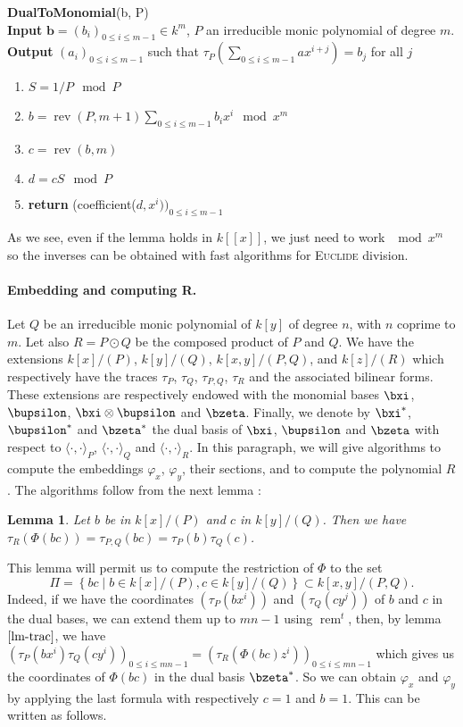 \documentclass[a4paper,11pt]{article}
\theoremstyle{break}
\newtheorem{lm}[thm]{Lemma}
\theoremstyle{definition}
\theoremstyle{remark}
\DeclareMathOperator{\rev}{rev}
\DeclareMathOperator{\rem}{rem}
\newcommand{\ps}[2]{\langle#1,#2\rangle}
\newcommand{\psdot}{\ps{\cdot}{\cdot}}
\newcommand{\remt}{\rem^t}
\begin{document}
\textbf{DualToMonomial}(b, P)\\
\textbf{Input} $\textbf{b}=(b_i)_{0\leq i\leq m-1}\in k^m$, $P$ an irreducible
monic polynomial of degree $m$.\\
\textbf{Output} $(a_i)_{0\leq i \leq m-1}$ such that
$\tau_P(\sum_{0\leq i \leq m-1}ax^{i+j})=b_j$ for all $j$
\begin{enumerate}
  \item $S=1/P \mod P$
  \item $b=\rev(P,m+1)\sum_{0\leq i\leq m-1}b_ix^i\mod x^m$
  \item $c=\rev(b,m)$
  \item $d=cS \mod P$
  \item \textbf{return} (coefficient($d,x^i))_{0\leq i \leq m-1}$
\end{enumerate}

As we see, even if the lemma holds in $k[[x]]$, we just need to work $\mod x^m$
so the inverses can be obtained with fast algorithms for \textsc{Euclide}
division.

\paragraph{Embedding and computing R.} Let $Q$ be an irreducible monic
polynomial of $k[y]$ of degree $n$, with $n$ coprime to $m$. Let also $R=P\odot
Q$ be the composed product of $P$ and $Q$. We have the extensions $k[x]/(P)$,
$k[y]/(Q)$, $k[x,y]/(P,Q)$, and $k[z]/(R)$ which respectively have the traces
$\tau_P$, $\tau_Q$, $\tau_{P,Q}$, $\tau_R$ and the associated bilinear forms.
These extensions are respectively endowed with the monomial bases $\bxi$,
$\bupsilon$, $\bxi\otimes\bupsilon$ and $\bzeta$. Finally, we denote by
$\bxi^*$, $\bupsilon^*$ and $\bzeta^*$ the dual basis of $\bxi$, $\bupsilon$ and
$\bzeta$ with respect to $\psdot_P$, $\psdot_Q$ and $\psdot_R$. In this paragraph, we will
give algorithms to compute the embeddings $\varphi_x$, $\varphi_y$, their
sections, and to compute the polynomial $R$. The algorithms follow from the next
lemma :
\begin{lm}
  \label{lm-trac}
  Let $b$ be in $k[x]/(P)$ and $c$ in $k[y]/(Q)$. Then we have
  $\tau_R(\Phi(bc))=\tau_{P,Q}(bc)=\tau_P(b)\tau_Q(c)$.
\end{lm}
This lemma will permit us to compute the restriction of $\Phi$ to the set 
\[
  \Pi=\left\{ bc \;|\; b\in k[x]/(P), c\in k[y]/(Q) \right\}\subset
  k[x,y]/(P,Q).
\]
Indeed, if we have the coordinates $(\tau_P(bx^i))$ and $(\tau_Q(cy^j))$ of $b$ and
$c$ in the dual bases, we can extend them up to $mn-1$ using $\remt$, then, by lemma $\ref{lm-trac}$, we have
$(\tau_P(bx^i)\tau_Q(cy^i))_{0\leq i \leq mn-1}=(\tau_R(\Phi(bc)z^i))_{0\leq i
\leq mn-1}$ which gives us the coordinates of $\Phi(bc)$ in the dual basis
$\bzeta^*$. So we can obtain $\varphi_x$ and $\varphi_y$ by applying the last
formula with respectively $c=1$ and $b=1$. This can be written as follows.
\newline
\end{document}
